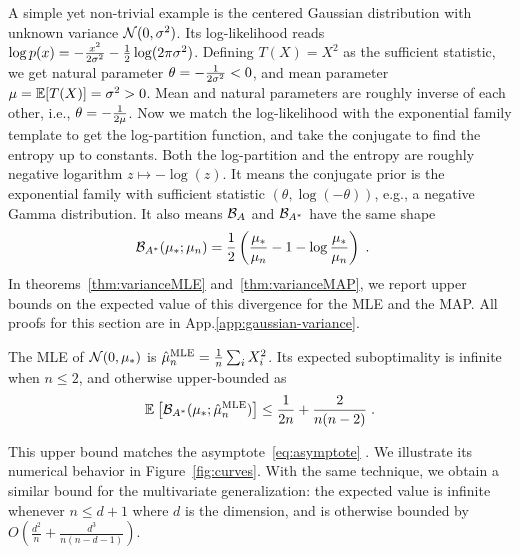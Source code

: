 \documentclass[twoside]{article}
\newcommand*{\expect}[2][]{\ensuremath{\mathbb{E}_{#1} \left[ #2 \right] }} %
\newcommand{\logpart}{A}
\newcommand{\conj}{\logpart^*}
\newcommand{\bregman}{\cB_\logpart}
\newcommand{\bregmanconj}{\cB_{\logpart^*}}
\newcommand{\nat}{\theta}
\newcommand{\m}{\mu}
\begin{document}
A simple yet non-trivial example is the centered Gaussian distribution with unknown variance ${\mathcal N}(0,\sigma^2)$.
Its log-likelihood reads $\log p(x) = -\frac{x^2}{2 \sigma^2} - \frac{1}{2}\log(2\pi \sigma^2)$.
Defining $T(X)=X^2$ as the sufficient statistic, we get natural parameter $\nat = -\inv{2 \sigma^2} <0$, and mean parameter $\m=\E[T(X)] = \sigma^2 >0$.
Mean and natural parameters are roughly inverse of each other, i.e., $\nat = -\inv{2 \m}$.
Now we match the log-likelihood with the exponential family template to get the log-partition function, and take the conjugate to find the entropy
\aligns{
	\logpart (\nat) = - \half \log(-\nat) \quad\text{and}\quad
	\conj(\m) = - \half \log(\m)  \; ,
}
up to constants.
Both the log-partition and  the entropy are roughly negative logarithm $z\mapsto - \log(z)$.
It means the conjugate prior is the exponential family with sufficient statistic $(\nat, \log(-\nat) )$, e.g., a negative Gamma distribution.
It also means $\bregman$ and $\bregmanconj$ have the same shape
\begin{align}
	\bregmanconj( \m_*; \m_n)
	&= \half \left ( \frac{\m_*}{ \m_n} - 1 - \log  \frac{\m_*}{ \m_n} \right) \; .
\end{align}
In theorems~\ref{thm:varianceMLE} and~\ref{thm:varianceMAP}, we report upper bounds on the expected value of this divergence for the MLE and the MAP.
All proofs for this section are in App.\ref{app:gaussian-variance}.
\begin{theorem}
\label{thm:varianceMLE}
	The MLE of $\cN(0,\m_*)$ is $\hat \m_n^\text{MLE} = \inv{n} \sum_i X_i^2 $.
	Its expected suboptimality is infinite when $n\leq 2$, and otherwise upper-bounded as
	\begin{align}
		 \expect{\bregmanconj( \m_*; \hat \m_n^\text{MLE}) }
			\leq \inv{2n} +\frac{2}{n(n-2)} \; .
			\label{eq:MLE_rate}
	\end{align}
\end{theorem}
This upper bound matches the asymptote~\eqref{eq:asymptote} .
We illustrate its numerical behavior in Figure~\ref{fig:curves}.
With the same technique, we obtain a similar bound for the multivariate generalization: the expected value is infinite whenever $n \leq d+1$ where $d$ is the dimension, and is otherwise bounded by $O(\frac{d^2}{n} + \frac{d^3}{n(n-d-1)} )$.
\end{document}
